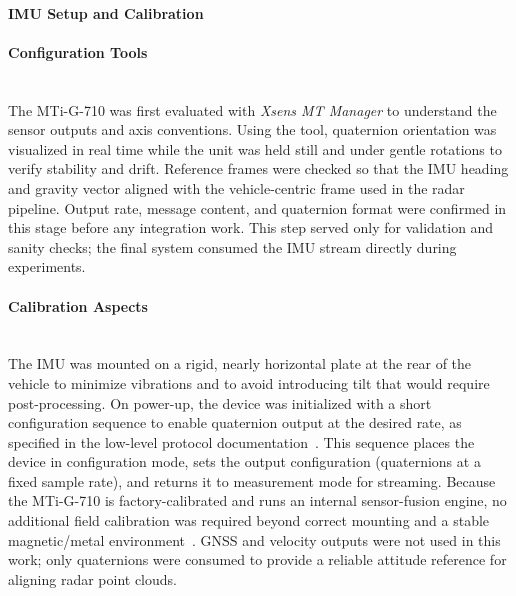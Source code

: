 \hfill
\\
\vspace{0.5em}
\noindent\textbf{IMU Setup and Calibration}
\label{sec:imu_setup_calibration}

\setcounter{paragraph}{0} %

\paragraph{Configuration Tools}
\hfill
\\
The MTi-G-710 was first evaluated with \textit{Xsens MT Manager} to understand the sensor outputs and axis conventions.  
Using the tool, quaternion orientation was visualized in real time while the unit was held still and under gentle rotations to verify stability and drift.  
Reference frames were checked so that the IMU heading and gravity vector aligned with the vehicle-centric frame used in the radar pipeline.  
Output rate, message content, and quaternion format were confirmed in this stage before any integration work.  
This step served only for validation and sanity checks; the final system consumed the IMU stream directly during experiments.  
\vspace{0.5em}
\paragraph{Calibration Aspects}
\hfill
\\
The IMU was mounted on a rigid, nearly horizontal plate at the rear of the vehicle to minimize vibrations and to avoid introducing tilt that would require post-processing.  
On power-up, the device was initialized with a short configuration sequence to enable quaternion output at the desired rate, as specified in the low-level protocol documentation~\cite{mti_lowlevel_doc}.  
This sequence places the device in configuration mode, sets the output configuration (quaternions at a fixed sample rate), and returns it to measurement mode for streaming.  
Because the MTi-G-710 is factory-calibrated and runs an internal sensor-fusion engine, no additional field calibration was required beyond correct mounting and a stable magnetic/metal environment~\cite{mti710_manual}.  
GNSS and velocity outputs were not used in this work; only quaternions were consumed to provide a reliable attitude reference for aligning radar point clouds.  
